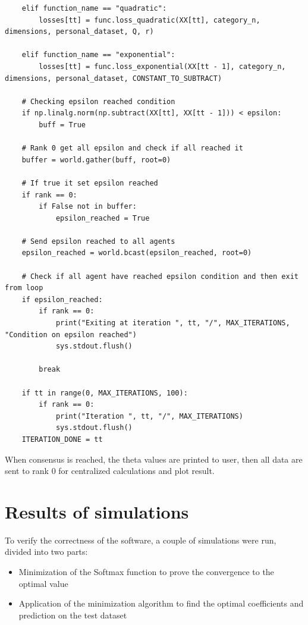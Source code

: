 \documentclass[a4paper,11pt,oneside]{book}
\begin{document}
\begin{lstlisting}
    elif function_name == "quadratic":
        losses[tt] = func.loss_quadratic(XX[tt], category_n, dimensions, personal_dataset, Q, r)

    elif function_name == "exponential":
        losses[tt] = func.loss_exponential(XX[tt - 1], category_n, dimensions, personal_dataset, CONSTANT_TO_SUBTRACT)

    # Checking epsilon reached condition
    if np.linalg.norm(np.subtract(XX[tt], XX[tt - 1])) < epsilon:
        buff = True

    # Rank 0 get all epsilon and check if all reached it
    buffer = world.gather(buff, root=0)

    # If true it set epsilon reached
    if rank == 0:
        if False not in buffer:
            epsilon_reached = True

    # Send epsilon reached to all agents
    epsilon_reached = world.bcast(epsilon_reached, root=0)

    # Check if all agent have reached epsilon condition and then exit from loop
    if epsilon_reached:
        if rank == 0:
            print("Exiting at iteration ", tt, "/", MAX_ITERATIONS, "Condition on epsilon reached")
            sys.stdout.flush()

        break

    if tt in range(0, MAX_ITERATIONS, 100):
        if rank == 0:
            print("Iteration ", tt, "/", MAX_ITERATIONS)
            sys.stdout.flush()
    ITERATION_DONE = tt
\end{lstlisting}

When consensus is reached, the theta values are printed to user, then all data are sent to rank 0 for centralized
calculations and plot result.



\chapter{Results of simulations} \label{Cap2}
	To verify the correctness of the software, a couple of simulations were run, divided into two parts:
\begin{itemize}
	\item Minimization of the Softmax function to prove the convergence to the optimal value
	\item Application of the minimization algorithm to find the optimal coefficients and prediction on the test dataset
\end{itemize}
\end{document}

